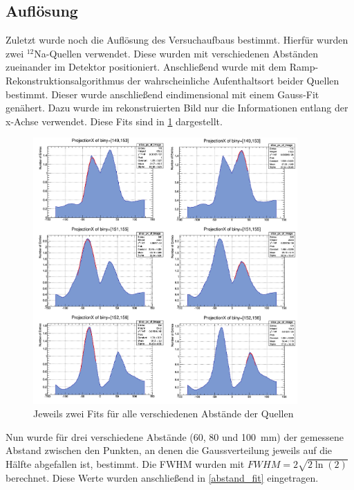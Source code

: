 \subsection{Auflösung}
Zuletzt wurde noch die Auflösung des Versuchaufbaus bestimmt. Hierfür wurden zwei $^12$Na-Quellen verwendet. Diese wurden mit verschiedenen Abständen zueinander im Detektor positioniert. Anschließend wurde mit dem Ramp-Rekonstruktionsalgorithmus der wahrscheinliche Aufenthaltsort beider Quellen bestimmt. Dieser wurde anschließend eindimensional mit einem Gauss-Fit genähert. Dazu wurde im rekonstruierten Bild nur die Informationen entlang der x-Achse verwendet. Diese Fits sind in \cref{abstand} dargestellt.

\begin{figure}[h]
	\centering
	\includegraphics[width=0.9\textwidth]{abstand_alle.png}
	\caption{Jeweils zwei Fits für alle verschiedenen Abstände der Quellen}
	\label{abstand}
\end{figure}

Nun wurde für drei verschiedene Abstände (60, 80 und \SI{100}{mm}) der gemessene Abstand zwischen den Punkten, an denen die Gaussverteilung jeweils auf die Hälfte abgefallen ist, bestimmt. Die FWHM wurden mit $FWHM = 2\sqrt{2\ln(2)}$ berechnet. Diese Werte wurden anschließend in \cref{abstand_fit} eingetragen.

